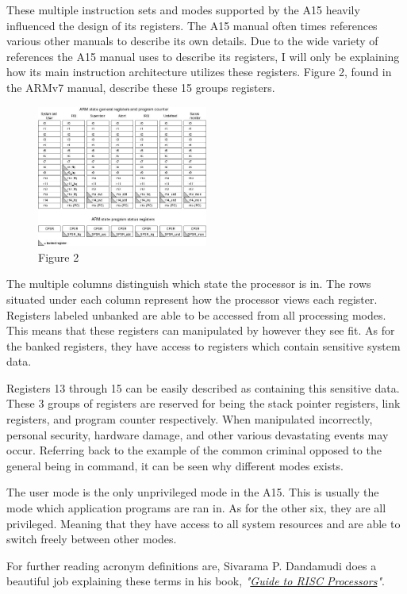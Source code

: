 \documentclass[12pt]{scrreprt}
\begin{document}
	These multiple instruction sets and modes supported by the A15 heavily influenced the design of its registers.
	The A15 manual often times references various other manuals to describe its own details.
	Due to the wide variety of references the A15 manual uses to describe its registers, I will only be explaining how its main instruction architecture utilizes these registers.
	Figure 2, found in the ARMv7 manual, describe these 15 groups registers.

	\begin{figure}[h]
		\centering
			\includegraphics[width=0.5\textwidth]{registers}
		\caption{Figure 2}
	\end{figure}

	The multiple columns distinguish which state the processor is in.
	The rows situated under each column represent how the processor views each register.
	Registers labeled unbanked are able to be accessed from all processing modes.
	This means that these registers can manipulated by however they see fit.
	As for the banked registers, they have access to registers which contain sensitive system data.

	Registers 13 through 15 can be easily described as containing this sensitive data.
	These 3 groups of registers are reserved for being the stack pointer registers, link registers, and program counter respectively.
	When manipulated incorrectly, personal security, hardware damage, and other various devastating events may occur.
	Referring back to the example of the common criminal opposed to the general being in command, it can be seen why different modes exists.

	The user mode is the only unprivileged mode in the A15.
	This is usually the mode which application programs are ran in.
	As for the other six, they are all privileged.
	Meaning that they have access to all system resources and are able to switch freely between other modes.

	For further reading acronym definitions are, Sivarama P. Dandamudi does a beautiful job explaining these terms in his book, \textit{"\underline{Guide to RISC Processors}"}.
\end{document}
